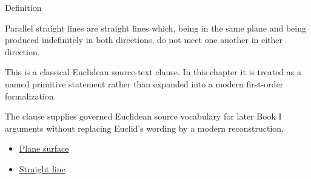 \begin{definitionbox}{Definition}
\begin{definition}
\label{def:euclid-parallel-straight-lines}
Parallel straight lines are straight lines which, being in the same plane and
being produced indefinitely in both directions, do not meet one another in
either direction.
\end{definition}
\end{definitionbox}
\begin{remark*}
This is a classical Euclidean source-text clause. In this chapter it is treated
as a named primitive statement rather than expanded into a modern first-order
formalization.
\end{remark*}

\begin{remark*}[Interpretation]
The clause supplies governed Euclidean source vocabulary for later Book I
arguments without replacing Euclid's wording by a modern reconstruction.
\end{remark*}

\begin{lra-not-visible}
\begin{dependencies}
\begin{itemize}
  \item \hyperref[def:euclid-plane-surface]{Plane surface}
  \item \hyperref[def:euclid-straight-line]{Straight line}
\end{itemize}
\end{dependencies}
\end{lra-not-visible}
